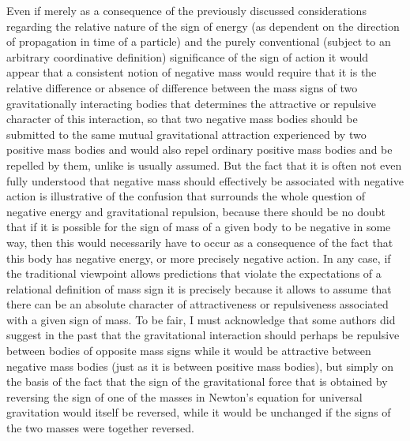 \documentclass[notitlepage,12pt]{report}
\begin{document}
\bigskip

\noindent Even if merely as a consequence of the previously discussed considerations regarding the relative nature of the sign of energy (as dependent on the direction of propagation in time of a particle) and the purely conventional (subject to an arbitrary coordinative definition) significance of the sign of action it would appear that a consistent notion of negative mass would require that it is the relative difference or absence of difference between the mass signs of two gravitationally interacting bodies that determines the attractive or repulsive character of this interaction, so that two negative mass bodies should be submitted to the same mutual gravitational attraction experienced by two positive mass bodies and would also repel ordinary positive mass bodies and be repelled by them, unlike is usually assumed. But the fact that it is often not even fully understood that negative mass should effectively be associated with negative action is illustrative of the confusion that surrounds the whole question of negative energy and gravitational repulsion, because there should be no doubt that if it is possible for the sign of mass of a given body to be negative in some way, then this would necessarily have to occur as a consequence of the fact that this body has negative energy, or more precisely negative action. In any case, if the traditional viewpoint allows predictions that violate the expectations of a relational definition of mass sign it is precisely because it allows to assume that there can be an absolute character of attractiveness or repulsiveness associated with a given sign of mass. To be fair, I must acknowledge that some authors did suggest in the past that the gravitational interaction should perhaps be repulsive between bodies of opposite mass signs while it would be attractive between negative mass bodies (just as it is between positive mass bodies), but simply on the basis of the fact that the sign of the gravitational force that is obtained by reversing the sign of one of the masses in Newton's equation for universal gravitation would itself be reversed, while it would be unchanged if the signs of the two masses were together reversed.
\end{document}
